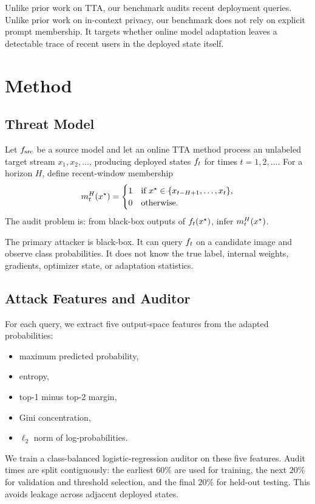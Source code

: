 Unlike prior work on TTA, our benchmark audits recent deployment queries. Unlike prior work on in-context privacy, our benchmark does not rely on explicit prompt membership. It targets whether online model adaptation leaves a detectable trace of recent users in the deployed state itself.

\section{Method}
\label{sec:method}

\subsection{Threat Model}

Let $f_{\mathrm{src}}$ be a source model and let an online TTA method process an unlabeled target stream $x_1,x_2,\ldots$, producing deployed states $f_t$ for times $t=1,2,\ldots$. For a horizon $H$, define recent-window membership
\begin{equation}
m_t^H(x^\star) =
\begin{cases}
1 & \text{if } x^\star \in \{x_{t-H+1},\ldots,x_t\},\\
0 & \text{otherwise.}
\end{cases}
\end{equation}
The audit problem is: from black-box outputs of $f_t(x^\star)$, infer $m_t^H(x^\star)$.

The primary attacker is black-box. It can query $f_t$ on a candidate image and observe class probabilities. It does not know the true label, internal weights, gradients, optimizer state, or adaptation statistics.

\subsection{Attack Features and Auditor}

For each query, we extract five output-space features from the adapted probabilities:
\begin{itemize}
  \item maximum predicted probability,
  \item entropy,
  \item top-1 minus top-2 margin,
  \item Gini concentration,
  \item $\ell_2$ norm of log-probabilities.
\end{itemize}
We train a class-balanced logistic-regression auditor on these five features. Audit times are split contiguously: the earliest $60\%$ are used for training, the next $20\%$ for validation and threshold selection, and the final $20\%$ for held-out testing. This avoids leakage across adjacent deployed states.

